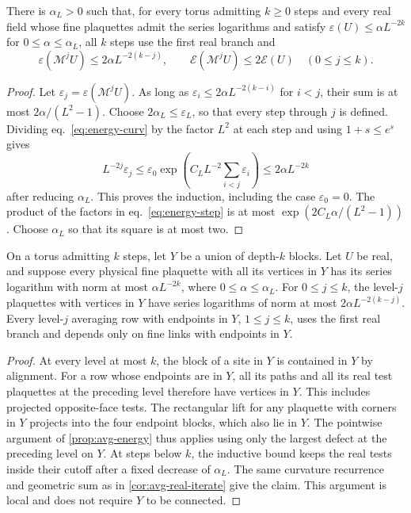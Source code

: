\documentclass[11pt,letterpaper,reqno]{amsart}
\makeatletter
\numberwithin{equation}{section}
\renewcommand{\eqref}[1]{\textup{eq.~\ref{#1}}}
\theoremstyle{definition}
\newcommand{\ms@majorstart}{%
  \pushQED{\qed}\renewcommand{\qedsymbol}{$\blacksquare\square$}}
\newenvironment{corollary}[1][]{\ms@majorstart\ms@corollary[#1]}
  {\popQED\endms@corollary}
\theoremstyle{remark}
\makeatother
\begin{document}
\begin{corollary}[Iteration]\label{cor:avg-real-iterate}
There is \(\alpha_L>0\) such that, for every torus admitting \(k\ge0\)
steps and every real field whose fine plaquettes admit the series
logarithms and satisfy
\(\varepsilon(U)\le\alpha L^{-2k}\) for \(0\le\alpha\le\alpha_L\),
all \(k\) steps use the first real branch and
\begin{equation}\label{eq:energy-depth}
 \varepsilon(\mathcal M^j U)\le 2\alpha L^{-2(k-j)},\qquad
 \mathcal E(\mathcal M^j U)\le 2\mathcal E(U)
 \quad(0\le j\le k).
\end{equation}
\end{corollary}

\begin{proof}
Let \(\varepsilon_j=\varepsilon(\mathcal M^j U)\).
As long as \(\varepsilon_i\le 2\alpha L^{-2(k-i)}\) for \(i<j\),
their sum is at most \(2\alpha/(L^2-1)\). Choose
\(2\alpha_L\le\varepsilon_L\), so that every step through \(j\)
is defined. Dividing \eqref{eq:energy-curv} by the factor \(L^2\)
at each step and using \(1+s\le e^s\) gives
\[
 L^{-2j}\varepsilon_j
 \le \varepsilon_0 \exp\!\left(C_L L^{-2}\sum_{i<j}\varepsilon_i\right)
 \le 2\alpha L^{-2k}
\]
after reducing \(\alpha_L\). This proves the induction, including the
case \(\varepsilon_0=0\). The product of the factors in
\eqref{eq:energy-step} is at most
\(\exp(2C_L\alpha/(L^2-1))\). Choose \(\alpha_L\) so that its
square is at most two.
\end{proof}

\begin{corollary}[Curvature on complete local stocks]
\label{cor:avg-local-real-iterate}
On a torus admitting \(k\) steps, let \(Y\) be a union of
depth-\(k\) blocks. Let \(U\) be real, and suppose every
physical fine plaquette with all its vertices in \(Y\) has
its series logarithm with norm at most \(\alpha L^{-2k}\),
where \(0\le\alpha\le\alpha_L\). For \(0\le j\le k\), the
level-\(j\) plaquettes with vertices in \(Y\) have series
logarithms of norm at most \(2\alpha L^{-2(k-j)}\).
Every level-\(j\) averaging row with endpoints in \(Y\),
\(1\le j\le k\), uses the first real branch and depends only
on fine links with endpoints in \(Y\).
\end{corollary}

\begin{proof}
At every level at most \(k\), the block of a site in \(Y\)
is contained in \(Y\) by alignment. For a row whose endpoints
are in \(Y\), all its paths and all its real test plaquettes
at the preceding level therefore have vertices in \(Y\).
This includes projected opposite-face tests. The rectangular
lift for any plaquette with corners in \(Y\) projects into
the four endpoint blocks, which also lie in \(Y\).
The pointwise argument of \cref{prop:avg-energy} thus applies
using only the largest defect at the preceding level on \(Y\).
At steps below \(k\), the inductive bound keeps the real tests
inside their cutoff after a fixed decrease of \(\alpha_L\).
The same curvature recurrence and geometric sum as in
\cref{cor:avg-real-iterate} give the claim. This argument is
local and does not require \(Y\) to be connected.\end{proof}
\end{document}
